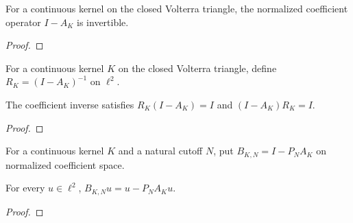 \begin{supporting}
\begin{theorem}
\label{thm:volterra-coefficient-invertible}
\leanok
For a continuous kernel on the closed Volterra triangle, the normalized
coefficient operator $I-A_K$ is invertible.
\end{theorem}
\begin{proof}
\leanok
\end{proof}

\begin{definition}
\label{def:volterra-coefficient-inverse}
\leanok
For a continuous kernel $K$ on the closed Volterra triangle, define
$R_K=(I-A_K)^{-1}$ on $\ell^2$.
\end{definition}

\begin{theorem}
\label{thm:volterra-coefficient-inverse}
\leanok
The coefficient inverse satisfies $R_K(I-A_K)=I$ and $(I-A_K)R_K=I$.
\end{theorem}
\begin{proof}
\leanok
\end{proof}

\begin{definition}
\label{def:volterra-coefficient-section}
\leanok
For a continuous kernel $K$ and a natural cutoff $N$, put
$B_{K,N}=I-P_NA_K$ on normalized coefficient space.
\end{definition}

\begin{theorem}
\label{thm:volterra-coefficient-section}
\leanok
For every $u\in\ell^2$, $B_{K,N}u=u-P_NA_Ku$.
\end{theorem}
\begin{proof}
\leanok
\end{proof}
\end{supporting}


